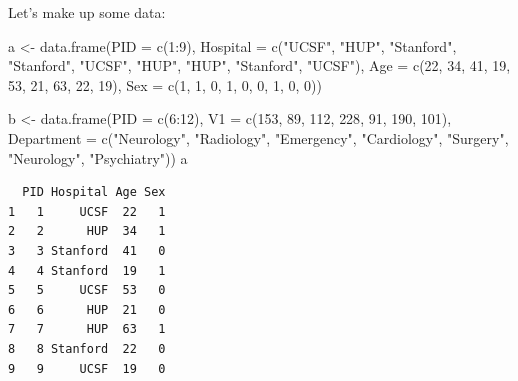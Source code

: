 \documentclass[
]{book}
\newenvironment{Shaded}{\begin{snugshade}}{\end{snugshade}}
\newcommand{\AttributeTok}[1]{\textcolor[rgb]{0.77,0.63,0.00}{#1}}
\newcommand{\DecValTok}[1]{\textcolor[rgb]{0.00,0.00,0.81}{#1}}
\newcommand{\FunctionTok}[1]{\textcolor[rgb]{0.00,0.00,0.00}{#1}}
\newcommand{\NormalTok}[1]{#1}
\newcommand{\OtherTok}[1]{\textcolor[rgb]{0.56,0.35,0.01}{#1}}
\newcommand{\SpecialCharTok}[1]{\textcolor[rgb]{0.00,0.00,0.00}{#1}}
\newcommand{\StringTok}[1]{\textcolor[rgb]{0.31,0.60,0.02}{#1}}
\begin{document}
Let's make up some data:

\begin{Shaded}
\begin{Highlighting}[]
\NormalTok{a }\OtherTok{\textless{}{-}} \FunctionTok{data.frame}\NormalTok{(}\AttributeTok{PID =} \FunctionTok{c}\NormalTok{(}\DecValTok{1}\SpecialCharTok{:}\DecValTok{9}\NormalTok{),}
                \AttributeTok{Hospital =} \FunctionTok{c}\NormalTok{(}\StringTok{"UCSF"}\NormalTok{, }\StringTok{"HUP"}\NormalTok{, }\StringTok{"Stanford"}\NormalTok{,}
                             \StringTok{"Stanford"}\NormalTok{, }\StringTok{"UCSF"}\NormalTok{, }\StringTok{"HUP"}\NormalTok{, }
                             \StringTok{"HUP"}\NormalTok{, }\StringTok{"Stanford"}\NormalTok{, }\StringTok{"UCSF"}\NormalTok{),}
                \AttributeTok{Age =} \FunctionTok{c}\NormalTok{(}\DecValTok{22}\NormalTok{, }\DecValTok{34}\NormalTok{, }\DecValTok{41}\NormalTok{, }\DecValTok{19}\NormalTok{, }\DecValTok{53}\NormalTok{, }\DecValTok{21}\NormalTok{, }\DecValTok{63}\NormalTok{, }\DecValTok{22}\NormalTok{, }\DecValTok{19}\NormalTok{),}
                \AttributeTok{Sex =} \FunctionTok{c}\NormalTok{(}\DecValTok{1}\NormalTok{, }\DecValTok{1}\NormalTok{, }\DecValTok{0}\NormalTok{, }\DecValTok{1}\NormalTok{, }\DecValTok{0}\NormalTok{, }\DecValTok{0}\NormalTok{, }\DecValTok{1}\NormalTok{, }\DecValTok{0}\NormalTok{, }\DecValTok{0}\NormalTok{))}

\NormalTok{b  }\OtherTok{\textless{}{-}} \FunctionTok{data.frame}\NormalTok{(}\AttributeTok{PID =} \FunctionTok{c}\NormalTok{(}\DecValTok{6}\SpecialCharTok{:}\DecValTok{12}\NormalTok{),}
                 \AttributeTok{V1 =} \FunctionTok{c}\NormalTok{(}\DecValTok{153}\NormalTok{, }\DecValTok{89}\NormalTok{, }\DecValTok{112}\NormalTok{, }\DecValTok{228}\NormalTok{,  }\DecValTok{91}\NormalTok{, }\DecValTok{190}\NormalTok{, }\DecValTok{101}\NormalTok{),}
                 \AttributeTok{Department =} \FunctionTok{c}\NormalTok{(}\StringTok{"Neurology"}\NormalTok{, }\StringTok{"Radiology"}\NormalTok{,}
                                \StringTok{"Emergency"}\NormalTok{, }\StringTok{"Cardiology"}\NormalTok{,}
                                \StringTok{"Surgery"}\NormalTok{, }\StringTok{"Neurology"}\NormalTok{, }\StringTok{"Psychiatry"}\NormalTok{))}
\NormalTok{a}
\end{Highlighting}
\end{Shaded}

\begin{verbatim}
  PID Hospital Age Sex
1   1     UCSF  22   1
2   2      HUP  34   1
3   3 Stanford  41   0
4   4 Stanford  19   1
5   5     UCSF  53   0
6   6      HUP  21   0
7   7      HUP  63   1
8   8 Stanford  22   0
9   9     UCSF  19   0
\end{verbatim}
\end{document}
